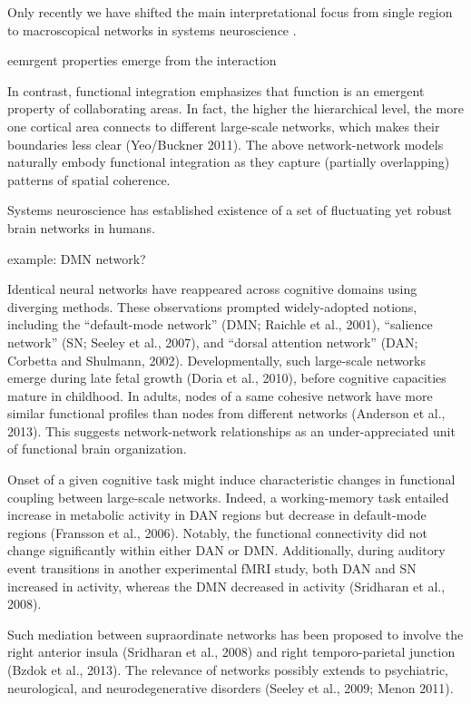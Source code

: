 \documentclass{article} %
\begin{document}
{Only recently we have shifted the main interpretational focus
from single region to macroscopical networks
in systems neuroscience \citep{yuste2015}.


eemrgent properties emerge from the interaction

In
contrast, functional integration emphasizes that function is an
emergent property of collaborating areas. In fact, the higher the
hierarchical level, the more one cortical area connects to different
large-scale networks, which makes their boundaries less clear
(Yeo/Buckner 2011). The above network-network models naturally embody
functional integration as they capture (partially overlapping)
patterns of spatial coherence.

Systems neuroscience has established existence of a
set of fluctuating yet robust brain networks in humans. 

example: DMN network?


Identical neural networks have reappeared across cognitive domains
using diverging methods. These observations prompted widely-adopted
notions, including the ``default-mode network'' \cite{raichle2001} (DMN; Raichle et al.,
2001), ``salience network'' (SN; Seeley et al., 2007), and ``dorsal
attention network'' (DAN; Corbetta and Shulmann,
2002). Developmentally, such large-scale networks emerge during late
fetal growth (Doria et al., 2010), before cognitive capacities mature
in childhood. In adults, nodes of a same cohesive network have more
similar functional profiles than nodes from different networks
(Anderson et al., 2013).
This
suggests network-network relationships as an under-appreciated unit of
functional brain organization.



Onset of a given cognitive task might induce
characteristic changes in functional coupling between large-scale
networks. Indeed, a working-memory task entailed increase in metabolic
activity in DAN regions but decrease in default-mode regions (Fransson
et al., 2006). Notably, the functional connectivity did not change
significantly within either DAN or DMN. Additionally, during auditory
event transitions in another experimental fMRI study, both DAN and SN
increased in activity, whereas the DMN decreased in activity
(Sridharan et al., 2008). 
 

Such mediation between supraordinate networks
has been proposed to involve the right anterior insula (Sridharan et
al., 2008) and right temporo-parietal junction (Bzdok et al.,
2013).
The relevance of networks
possibly extends to psychiatric, neurological, and neurodegenerative
disorders (Seeley et al., 2009; Menon 2011).

}
\end{document}
